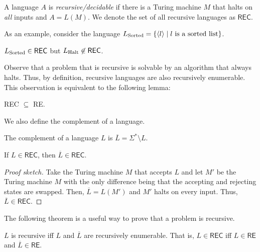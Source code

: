 \documentclass[11pt,usenames, dvipsnames]{article}
\begin{document}
\begin{definition}
  A language $A$ is \emph{recursive/decidable} if there is a Turing machine $M$ that halts on \emph{all} inputs and $A = L(M)$. We denote the set of all recursive languages as $\textsf{REC}$.
\end{definition}

As an example, consider the language $L\textsubscript{Sorted} = \{\langle l \rangle \mid l \text{ is a sorted list}\}$.

\begin{example}
  $L\textsubscript{Sorted} \in \textsf{REC}$ but $L\textsubscript{Halt} \not\in \textsf{REC}$.
\end{example}

Observe that a problem that is recursive is solvable by an algorithm that always halts. Thus, by definition, recursive languages are also recursively enumerable. This observation is equivalent to the following lemma:

\begin{lemma}
  \textsf{REC} $\subseteq$ \textsf{RE}.
\end{lemma}

We also define the complement of a language.

\begin{definition}
  The complement of a language $L$ is $\overline{L} = \Sigma^* \setminus L$.
\end{definition}

\begin{theorem}
  If $L \in \textsf{REC}$, then $\overline{L} \in \textsf{REC}$.
\end{theorem}

\begin{proof}[Proof sketch]
  Take the Turing machine $M$ that accepts $L$ and let $M'$ be the Turing machine $M$ with the only difference being that the accepting and rejecting states are swapped. Then, $\overline{L} = L(M')$ and $M'$ halts on every input. Thus, $\overline{L} \in \textsf{REC}$.
\end{proof}

The following theorem is a useful way to prove that a problem is recursive.

\begin{theorem}
  $L$ is recursive iff $L$ and $\overline{L}$ are recursively enumerable. That is, $L \in \textsf{REC}$ iff $L \in \textsf{RE}$ and $\overline{L} \in \textsf{RE}$.
\end{theorem}
\end{document}
